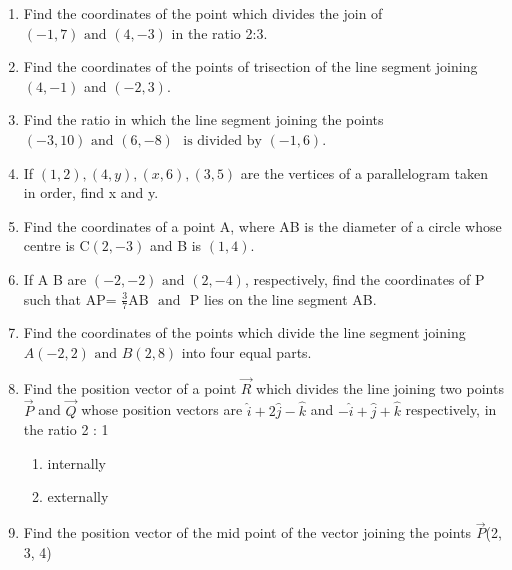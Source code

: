 \begin{enumerate}[label=\thesubsection.\arabic*,ref=\thesubsection.\theenumi]

\item Find the coordinates of the point which divides the join of $(-1,7) \text{ and } (4,-3)$ in the ratio 2:3.
	\\
		\solution
	
\item Find the coordinates of the points of trisection of the line segment joining $(4,-1)$  and  $(-2,3)$.
	\\
		\solution
	
\item Find the ratio in which the line segment joining the points $(-3,10) \text{ and } (6,-8)$ $\text{ is divided by } (-1,6)$.
	\\
		\solution
	
\item If $(1,2), (4,y), (x,6), (3,5)$ are the vertices of a parallelogram taken in order, find x and y.
	\\
		\solution
	
\item Find the coordinates of a point A, where AB is the diameter of a circle whose centre is C$ (2,-3)$  and  B is $(1,4)$.
	\\
		\solution
	
\item If A  B are $(-2,-2) \text{ and } (2,-4)$, respectively, find the coordinates of P such that AP= $\frac {3}{7}$AB $\text{ and }$ P lies on the line segment AB.
	\\
		\solution
	
\item Find the coordinates of the points which divide the line segment joining $A(-2,2) \text{ and } B(2,8)$ into four equal parts.
	\\
		\solution
	
\item Find the position vector of a point $\vec{R}$ which divides the line joining two points $\vec{P}$
and $\vec{Q}$ whose position vectors are $\hat{i}+2\hat{j}-\hat{k}$ and $-\hat{i}+\hat{j}+\hat{k}$ respectively, in the
ratio 2 : 1
\begin{enumerate}
    \item  internally
    \item  externally
\end{enumerate}
\solution
		
\item Find the position vector of the mid point of the vector joining the points $\vec{P}$(2, 3, 4)

\end{enumerate}
